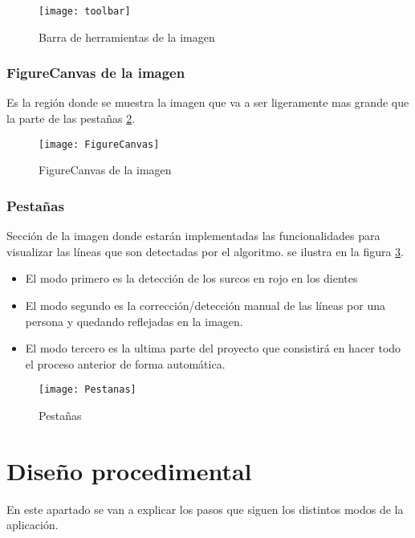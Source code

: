 \begin{figure}[h]
\centering
\texttt{[image: toolbar]}
\caption{Barra de herramientas de la imagen}\label{fig:5.11}
\end{figure}


\subsubsection{FigureCanvas de la imagen}
Es la región donde se muestra la imagen que va a ser ligeramente mas grande que la parte de las pestañas \ref{fig:5.12}.
\begin{figure}[h]
\centering
\texttt{[image: FigureCanvas]}
\caption{FigureCanvas de la imagen}
\label{fig:5.12}
\end{figure}


\subsubsection{Pestañas}
Sección de la imagen donde estarán implementadas las funcionalidades para visualizar las líneas que son detectadas por el algoritmo. se ilustra en la figura \ref{fig:5.13}.
\begin{itemize}
\item El modo primero es la detección de los surcos en rojo en los dientes 
\item El modo segundo es la corrección/detección manual de las líneas por una persona y quedando reflejadas en la imagen.
\item El modo tercero es la ultima parte del proyecto que consistirá en hacer todo el proceso anterior de forma automática.
\end{itemize}

\begin{figure}[h]
\centering
\texttt{[image: Pestanas]}
\caption{Pestañas}
\label{fig:5.13}
\end{figure}

\section{Diseño procedimental}
En este apartado se van a explicar los pasos que siguen los distintos modos de la aplicación.

